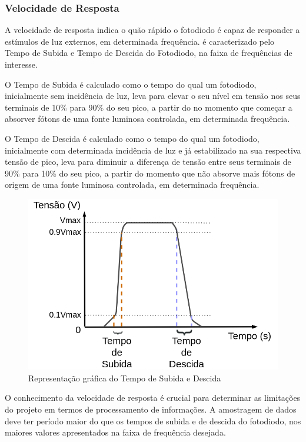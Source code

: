 \subsubsection{Velocidade de Resposta}
A velocidade de resposta indica o quão rápido o fotodiodo \'e capaz de responder a estímulos de luz externos, em determinada frequência. \'e caracterizado pelo Tempo de Subida e Tempo de Descida do Fotodiodo, na faixa de frequências de interesse.

O Tempo de Subida \'e calculado como o tempo do qual um fotodiodo, inicialmente sem incidência de luz, leva para elevar o seu nível em tensão nos seus terminais de 10\% para 90\% do seu pico, a partir do no momento que começar a absorver fótons de uma fonte luminosa controlada, em determinada frequência.

O Tempo de Descida \'e calculado como o tempo do qual um fotodiodo, inicialmente com determinada incidência de luz e já estabilizado na sua respectiva tensão de pico, leva para diminuir a diferença de tensão entre seus terminais de 90\% para 10\% do seu pico, a partir do momento que não absorve mais fótons de origem de uma fonte luminosa controlada, em determinada frequência.

\begin{figure}[htb]
	\caption{\label{fig_velocidadeResp}Representação gr\'afica do Tempo de Subida e Descida}
	\begin{center}
	    \includegraphics[scale=0.3]{Imagens/GraficoVelocidadeResposta.png}
	\end{center}
\end{figure}

O conhecimento da velocidade de resposta \'e crucial para determinar as limitações do projeto em termos de processamento de informações. A amostragem de dados deve ter período maior do que os tempos de subida e de descida do fotodiodo, nos maiores valores apresentados na faixa de frequência desejada.


